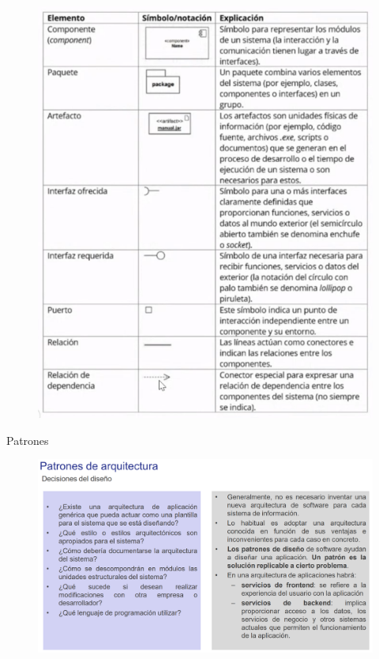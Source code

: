\documentclass[12pt, twoside, openright]{report} %
\begin{document}
\begin{figure}[H]
	{\includegraphics[scale=.25]{Untitled 35.png}}
\end{figure}
\pagebreak
Patrones
\begin{figure}[H]
	{\includegraphics[scale=.25]{Untitled 37.png}}
\end{figure}
\end{document}

